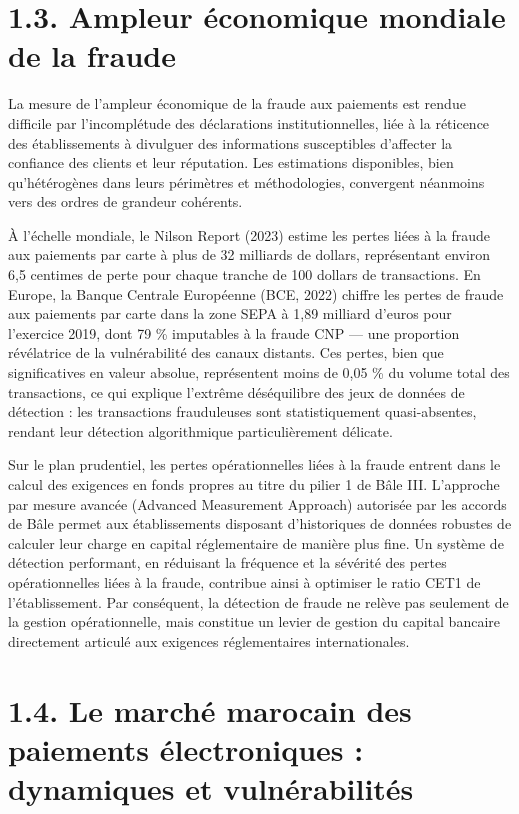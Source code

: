 \section{1.3. Ampleur économique mondiale de la fraude}

La mesure de l'ampleur économique de la fraude aux paiements est rendue difficile par l'incomplétude des déclarations institutionnelles, liée à la réticence des établissements à divulguer des informations susceptibles d'affecter la confiance des clients et leur réputation. Les estimations disponibles, bien qu'hétérogènes dans leurs périmètres et méthodologies, convergent néanmoins vers des ordres de grandeur cohérents.

À l'échelle mondiale, le Nilson Report (2023) estime les pertes liées à la fraude aux paiements par carte à plus de 32 milliards de dollars, représentant environ 6,5 centimes de perte pour chaque tranche de 100 dollars de transactions. En Europe, la Banque Centrale Européenne (BCE, 2022) chiffre les pertes de fraude aux paiements par carte dans la zone SEPA à 1,89 milliard d'euros pour l'exercice 2019, dont 79 \% imputables à la fraude CNP — une proportion révélatrice de la vulnérabilité des canaux distants. Ces pertes, bien que significatives en valeur absolue, représentent moins de 0,05 \% du volume total des transactions, ce qui explique l'extrême déséquilibre des jeux de données de détection : les transactions frauduleuses sont statistiquement quasi-absentes, rendant leur détection algorithmique particulièrement délicate.

Sur le plan prudentiel, les pertes opérationnelles liées à la fraude entrent dans le calcul des exigences en fonds propres au titre du pilier 1 de Bâle III. L'approche par mesure avancée (Advanced Measurement Approach) autorisée par les accords de Bâle permet aux établissements disposant d'historiques de données robustes de calculer leur charge en capital réglementaire de manière plus fine. Un système de détection performant, en réduisant la fréquence et la sévérité des pertes opérationnelles liées à la fraude, contribue ainsi à optimiser le ratio CET1 de l'établissement. Par conséquent, la détection de fraude ne relève pas seulement de la gestion opérationnelle, mais constitue un levier de gestion du capital bancaire directement articulé aux exigences réglementaires internationales.

\section{1.4. Le marché marocain des paiements électroniques : dynamiques et vulnérabilités}

